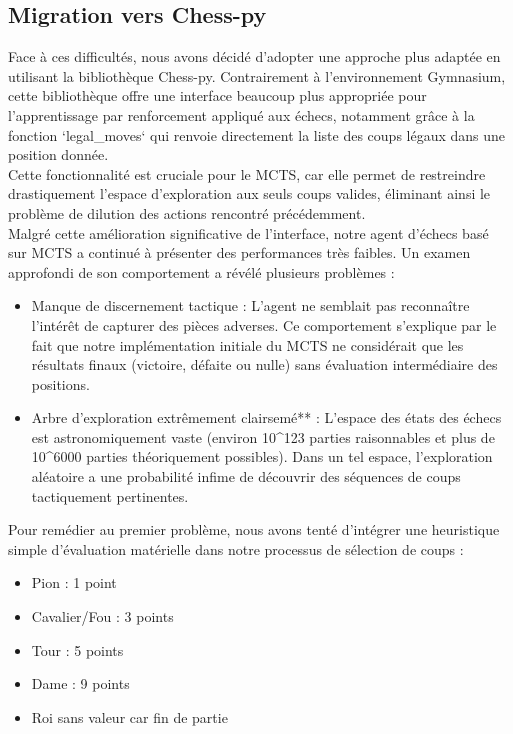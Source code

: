 \documentclass{article}
\begin{document}
\subsection{Migration vers Chess-py}

\quad Face à ces difficultés, nous avons décidé d'adopter une approche plus adaptée en utilisant la bibliothèque Chess-py. Contrairement à l'environnement Gymnasium, cette bibliothèque offre une interface beaucoup plus appropriée pour l'apprentissage par renforcement appliqué aux échecs, notamment grâce à la fonction `legal\_moves` qui renvoie directement la liste des coups légaux dans une position donnée.\\

Cette fonctionnalité est cruciale pour le MCTS, car elle permet de restreindre drastiquement l'espace d'exploration aux seuls coups valides, éliminant ainsi le problème de dilution des actions rencontré précédemment.\\

Malgré cette amélioration significative de l'interface, notre agent d'échecs basé sur MCTS a continué à présenter des performances très faibles. Un examen approfondi de son comportement a révélé plusieurs problèmes :
\begin{itemize} 
    \item Manque de discernement tactique : L'agent ne semblait pas reconnaître l'intérêt de capturer des pièces adverses. Ce comportement s'explique par le fait que notre implémentation initiale du MCTS ne considérait que les résultats finaux (victoire, défaite ou nulle) sans évaluation intermédiaire des positions.
    \item Arbre d'exploration extrêmement clairsemé** : L'espace des états des échecs est astronomiquement vaste (environ 10\^{}123 parties raisonnables et plus de 10\^{}6000 parties théoriquement possibles). Dans un tel espace, l'exploration aléatoire a une probabilité infime de découvrir des séquences de coups tactiquement pertinentes.
\end{itemize}

Pour remédier au premier problème, nous avons tenté d'intégrer une heuristique simple d'évaluation matérielle dans notre processus de sélection de coups :
\begin{itemize} 
    \item Pion : 1 point
    \item Cavalier/Fou : 3 points
    \item Tour : 5 points
    \item Dame : 9 points
    \item Roi sans valeur car fin de partie
\end{itemize}
\end{document}
